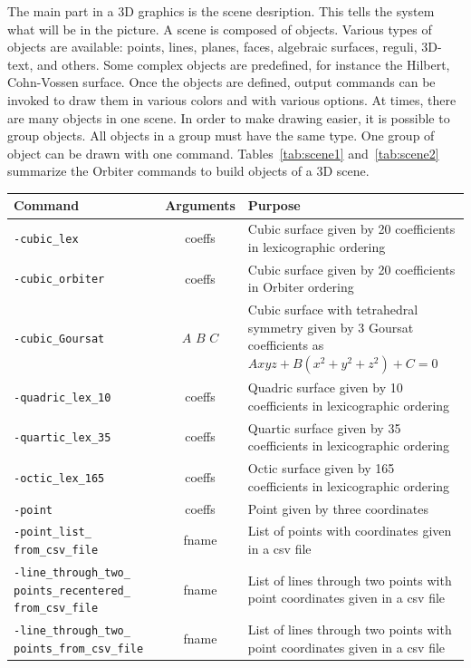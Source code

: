The main part in a 3D graphics is the scene desription. This tells the system what will be in the picture. 
A scene is composed of objects. Various types of objects are available: 
points, lines, planes, faces, algebraic surfaces, reguli, 3D-text,  
and others.
Some complex objects are predefined, for instance the Hilbert, Cohn-Vossen surface. 
Once the objects are defined, output commands can be invoked to draw them in various colors and with various options.
At times, there are many objects in one scene. In order to make drawing easier, it is possible to group objects. 
All objects in a group must have the same type. 
One group of object can be drawn with one command.
Tables~\ref{tab:scene1} and~\ref{tab:scene2} summarize the Orbiter commands to build objects of a 3D scene.
\begin{table}
	\begin{center}
	\begin{tabular}{|p{4.5cm}|c|p{8cm}|}
		\hline
		Command & Arguments & Purpose \\
		\hline
		\hline
		\verb'-cubic_lex' & coeffs & Cubic surface given by 20 coefficients in lexicographic ordering \\
		\hline
		\verb'-cubic_orbiter' & coeffs & Cubic surface given by 20 coefficients in Orbiter ordering \\
		\hline
		\verb'-cubic_Goursat' & $A$ $B$ $C$ & Cubic surface with tetrahedral symmetry given by 3 Goursat coefficients as $Axyz + B(x^2+y^2+z^2)+C=0$ \\
		\hline
		\verb'-quadric_lex_10' & coeffs & Quadric surface given by 10 coefficients in lexicographic ordering \\
		\hline
		\verb'-quartic_lex_35' & coeffs & Quartic surface given by 35 coefficients in lexicographic ordering \\
		\hline
		\verb'-octic_lex_165' & coeffs & Octic surface given by 165 coefficients in lexicographic ordering \\
		\hline
		\verb'-point' & coeffs & Point given by three coordinates \\
		\hline
		\verb'-point_list_' \verb'from_csv_file' & fname & List of points with coordinates given in a csv file \\
		\hline
		\verb'-line_through_two_' \verb'points_recentered_' \verb'from_csv_file' & fname & List of lines through two points with point coordinates given in a csv file \\
		\hline
		\verb'-line_through_two_' \verb'points_from_csv_file' & fname & List of lines through two points with point coordinates given in a csv file \\

\end{tabular}
\end{center}
\end{table}
